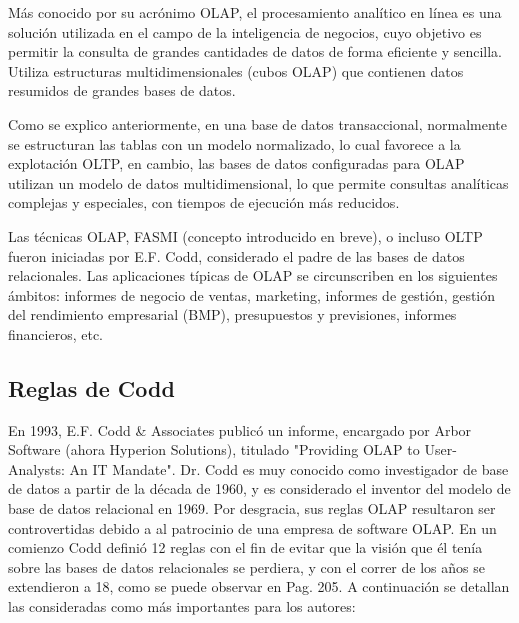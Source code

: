 \documentclass[a4paper,11pt]{article}
\begin{document}
\begin{flushleft}
    Más conocido por su acrónimo OLAP, el procesamiento analítico en línea es una solución utilizada en el campo de la inteligencia de negocios, cuyo 
    objetivo es permitir la consulta de grandes cantidades de datos de forma eficiente y sencilla. Utiliza estructuras multidimensionales (cubos OLAP) que 
    contienen datos resumidos de grandes bases de datos.\par
    
    Como se explico anteriormente, en una base de datos transaccional, normalmente se estructuran las tablas con un modelo normalizado, lo cual favorece a
    la explotación OLTP, en cambio, las bases de datos configuradas para OLAP utilizan un modelo de datos multidimensional, lo que permite consultas 
    analíticas complejas y especiales, con tiempos de ejecución más reducidos.\par

    Las técnicas OLAP, FASMI (concepto introducido en breve), o incluso OLTP fueron iniciadas por E.F. Codd, considerado el padre de las bases de datos
    relacionales. Las aplicaciones típicas de OLAP se circunscriben en los siguientes ámbitos: informes de negocio de ventas, marketing, informes de gestión,
    gestión del rendimiento empresarial (BMP), presupuestos y previsiones, informes financieros, etc.
    
    
    \subsection{Reglas de Codd}
    
    En 1993, E.F. Codd \& Associates publicó un informe, encargado por Arbor Software (ahora Hyperion Solutions), titulado "Providing OLAP to User-Analysts:
    An IT Mandate". Dr. Codd es muy conocido como investigador de base de datos a partir de la década de 1960, y es considerado el inventor del modelo
    de base de datos relacional en 1969. Por desgracia, sus reglas OLAP resultaron ser controvertidas debido a al patrocinio de una empresa de software OLAP.
    En un comienzo Codd definió 12 reglas con el fin de evitar que la visión que él tenía sobre las bases de datos relacionales se perdiera, y con el correr
    de los años se extendieron a 18, como se puede observar en \cite{nagabhushana} Pag. 205. A continuación se detallan las consideradas como más importantes 
    para los autores:
    

\end{flushleft}
\end{document}
